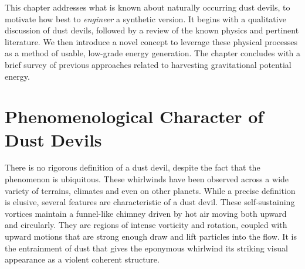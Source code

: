 \label{sec:physics}

This chapter addresses what is known about naturally occurring dust
devils, to motivate how best to \textit{engineer} a synthetic version. 
It begins with a qualitative discussion of dust devils, followed by a
review of the known physics and pertinent literature. 
We then introduce a novel concept to leverage these
physical processes as a method of usable, low-grade energy generation.  
The chapter concludes with a brief survey of previous
approaches related to harvesting gravitational potential energy.


\section{Phenomenological Character of Dust Devils}
\label{subsec:phenomena}

There is no rigorous definition of a dust devil, despite the fact that
the phenomenon is ubiquitous. These whirlwinds have been
observed across a wide variety of terrains, climates and even on
other planets\cite{Sinclair1969,Bluestein2004,JGR:JGR13978}. 
While a precise definition is elusive, several features 
are characteristic of a dust devil. These self-sustaining vortices
maintain a funnel-like chimney driven by hot air moving both upward and 
circularly. They are regions of intense vorticity and rotation, coupled
with upward motions that are strong enough draw and lift particles into
the flow. It is the entrainment of dust that gives the eponymous
whirlwind its striking visual appearance as a violent coherent
structure.   

